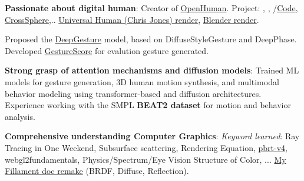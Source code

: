 	\begin{onecolentry}
		\begin{highlightsforbulletentries}
			
			\item \textbf{Passionate about digital human}: Creator of \href{https://github.com/openhuman-ai}{OpenHuman}.  Project: , , /\href{https://github.com/hairmimic/hairmimic.github.io}{Code}, \href{https://hmthanh.github.io/CrossSphere}{CrossSphere},..
			\href{https://x.com/OpenHuman/status/1941355456020250865}{Universal Human (Chris Jones) render}, \href{https://www.instagram.com/p/DKMV3xwJcQm}{Blender render}.
			
			
			Proposed the \href{https://deepgesture.github.io}{DeepGesture} model, based on DiffuseStyleGesture and DeepPhase. Developed \href{https://github.com/GestureScore/GestureScore}{GestureScore} for evalution gesture generated.
			
			\item \textbf{Strong grasp of attention mechanisms and diffusion models}: Trained ML models for gesture generation, 3D human motion synthesis, and multimodal behavior modeling using transformer-based and diffusion architectures. Experience working with the SMPL \textbf{BEAT2 dataset} for motion and behavior analysis.
			

			

			\item \textbf{Comprehensive understanding Computer Graphics}: \textit{Keyword learned}: Ray Tracing in One Weekend, Subsurface scattering, Rendering Equation, \href{https://github.com/hmthanh/pbrt-v4}{pbrt-v4}, webgl2fundamentals, Physics/Spectrum/Eye Vision Structure of Color, ... \href{https://mattergen.github.io}{My Fillament doc remake} (BRDF, Diffuse, Reflection).
			

\end{highlightsforbulletentries}
\end{onecolentry}
